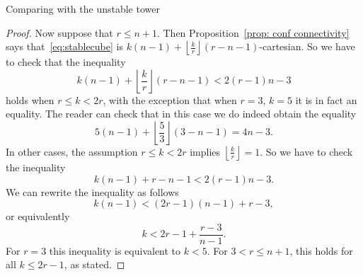\documentclass[12pt]{amsart}
\theoremstyle{plain}
\theoremstyle{definition}
\theoremstyle{remark}
\begin{document}
\begin{section}{Comparing with the unstable tower}
\begin{proof}
Now suppose that $r\le n+1$. Then Proposition~\ref{prop: conf connectivity} says that~\eqref{eq:stablecube} is $k(n-1)+\left\lfloor\frac{k}{r}\right\rfloor(r-n-1)$-cartesian. So we have to check that the inequality
\[
k(n-1)+\left\lfloor\frac{k}{r}\right\rfloor(r-n-1)< 2(r-1)n-3
\]
holds when $r\le k < 2r$, with the exception that when $r=3$, $k=5$ it is in fact an equality. The reader can check that in this case we do indeed obtain the equality
\[
5(n-1)+\left\lfloor\frac{5}{3}\right\rfloor(3-n-1)=4n-3.
\]
In other cases, the assumption $r\le k < 2r$ implies $\left\lfloor\frac{k}{r}\right\rfloor=1$. 
So we have to check the inequality
\[
k(n-1)+r-n-1< 2(r-1)n-3.
\]
We can rewrite the inequality as follows
\[
k(n-1)< (2r-1)(n-1) + r - 3,
\]
or equivalently
\[
k< 2r-1 + \frac{r-3}{n-1}.
\]
For $r=3$ this inequality is equivalent to $k<5$. For $3<r \le n+1$, this holds for all $k\le 2r-1$, as stated.
\end{proof}
\end{section}
\end{document}
